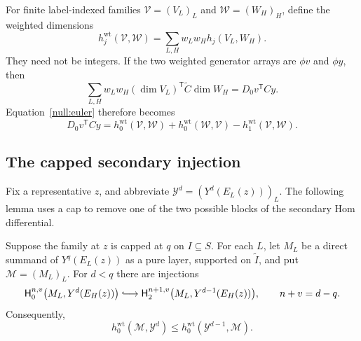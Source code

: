For finite label-indexed families $\mathcal V=(V_L)_L$ and
$\mathcal W=(W_H)_H$, define the weighted dimensions
\begin{equation}
 h_j^{\mathrm{wt}}(\mathcal V,\mathcal W)
    =\sum_{L,H}w_Lw_H h_j(V_L,W_H).
 \label{null:weighted-dimension}
\end{equation}
They need not be integers.  If the two weighted generator arrays are
$\phi v$ and $\phi y$, then
\[
 \sum_{L,H}w_Lw_H(\dim V_L)^{\mathsf T}\widetilde C\dim W_H
   =D_0v^{\mathsf T}Cy.
\]
Equation~\eqref{null:euler} therefore becomes
\begin{equation}
 D_0v^{\mathsf T}Cy
  =h_0^{\mathrm{wt}}(\mathcal V,\mathcal W)
   +h_0^{\mathrm{wt}}(\mathcal W,\mathcal V)
   -h_1^{\mathrm{wt}}(\mathcal V,\mathcal W).
 \label{null:weighted-euler}
\end{equation}

\subsection{The capped secondary injection}

Fix a representative $z$, and abbreviate
$\mathcal Y^d=(Y^d(E_L(z)))_L$.  The following lemma uses a cap to
remove one of the two possible blocks of the secondary Hom differential.

\begin{lemma}
\label{null:injection}
Suppose the family at $z$ is capped at $q$ on $I\subseteq S$.
For each $L$, let $M_L$ be a direct summand of $Y^q(E_L(z))$ as a
pure layer, supported on $\widetilde I$, and put
$\mathcal M=(M_L)_L$.  For $d<q$ there are injections
\begin{equation}
 \mathsf H_0^{n,v}\bigl(M_L,Y^d(E_H(z))\bigr)
 \lhook\joinrel\longrightarrow
 \mathsf H_2^{n+1,v}\bigl(M_L,Y^{d-1}(E_H(z))\bigr),
 \qquad n+v=d-q.
 \label{null:secondary-map}
\end{equation}
Consequently,
\begin{equation}
 h_0^{\mathrm{wt}}(\mathcal M,\mathcal Y^d)
    \le h_0^{\mathrm{wt}}(\mathcal Y^{d-1},\mathcal M).
 \label{null:secondary-bound}
\end{equation}
\end{lemma}

